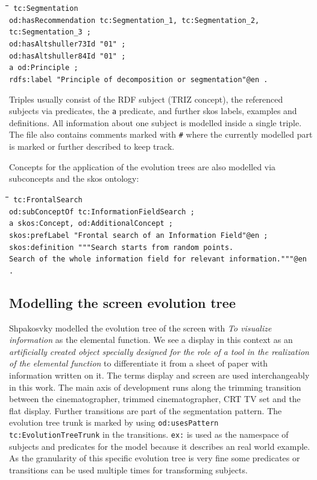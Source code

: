 \documentclass[11pt,a4paper]{article}
\newenvironment{code}{\tt \begin{tabbing}
\hskip12pt\=\hskip12pt\=\hskip12pt\=\hskip12pt\=\hskip5cm\=\hskip5cm\=\kill}
{\end{tabbing}}
\begin{document}
\begin{code}\tt
tc:Segmentation \\
\> od:hasRecommendation tc:Segmentation\_1, tc:Segmentation\_2,\\\>\>
tc:Segmentation\_3 ; \\ 
\> od:hasAltshuller73Id "01" ; \\
\> od:hasAltshuller84Id "01" ; \\
\> a od:Principle ; \\
\> rdfs:label "Principle of decomposition or segmentation"@en .
\end{code}

Triples usually consist of the RDF subject (TRIZ concept), the referenced
subjects via predicates, the \texttt{a} predicate, and further skos labels,
examples and definitions. All information about one subject is modelled inside
a single triple. The file also contains comments marked with \texttt{\#} where
the currently modelled part is marked or further described to keep track. 

Concepts for the application of the evolution trees are also modelled via
subconcepts and the skos ontology: 
\begin{code}\tt
tc:FrontalSearch \\
\> od:subConceptOf tc:InformationFieldSearch ; \\
\> a skos:Concept, od:AdditionalConcept ; \\
\> skos:prefLabel "Frontal search of an Information Field"@en ; \\
\> skos:definition """Search starts from random points. \\
\>\> Search of the whole information field for relevant information."""@en .
\end{code}

\subsection{Modelling the screen evolution tree}

Shpakosvky modelled the evolution tree of the screen with \textit{To visualize
  information} as the elemental function. We see a display in this context as
an \textit{artificially created object specially designed for the role of a
  tool in the realization of the elemental function}\cite{Shpakovsky2016} to
differentiate it from a sheet of paper with information written on it. The
terms display and screen are used interchangeably in this work. The main axis
of development runs along the trimming transition between the cinematographer,
trimmed cinematographer, CRT TV set and the flat display. Further transitions
are part of the segmentation pattern. The evolution tree trunk is marked by
using \texttt{od:usesPattern tc:EvolutionTreeTrunk} in the
transitions. \texttt{ex:} is used as the namespace of subjects and predicates
for the model because it describes an real world example. As the granularity
of this specific evolution tree is very fine some predicates or transitions
can be used multiple times for transforming subjects.
\end{document}
